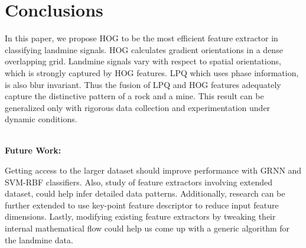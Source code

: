 \documentclass[english, 12pt]{article}
\begin{document}
\section{Conclusions}
\tab In this paper, we propose HOG to be the most efficient feature extractor in classifying landmine signals. HOG calculates gradient orientations in a dense overlapping grid. Landmine signals vary with respect to spatial orientations, which is strongly captured by HOG features. LPQ which uses phase information, is also blur invariant. Thus the fusion of LPQ and HOG features adequately capture the distinctive pattern of a rock and a mine. This result can be generalized only with rigorous data collection and experimentation under dynamic conditions. 
\\
\\
\begin{large}
\textbf{Future Work:}
\end{large}
Getting access to the larger dataset should improve performance with GRNN and SVM-RBF classifiers. Also, study of feature extractors involving extended dataset, could help infer detailed data patterns. Additionally, research can be further extended to use key-point feature descriptor to reduce input feature dimensions. Lastly, modifying existing feature extractors by tweaking their internal mathematical flow could help us come up with a generic algorithm for the landmine data.



\end{document}

